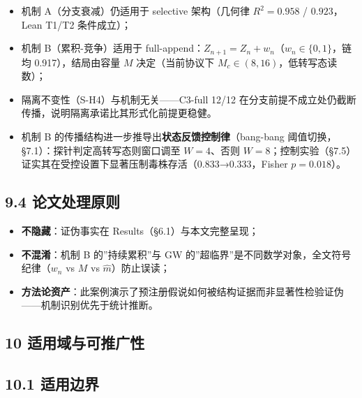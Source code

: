 \documentclass[
]{ctexart}
\providecommand{\tightlist}{%
  \setlength{\itemsep}{0pt}\setlength{\parskip}{0pt}}
\begin{document}
\begin{itemize}
\tightlist
\item
  机制 A（分支衰减）仍适用于 selective 架构（几何律 \(R^2=0.958\) /
  \(0.923\)，Lean T1/T2 条件成立）；
\item
  机制 B（累积-竞争）适用于
  full-append：\(Z_{n+1}=Z_n+w_n\)（\(w_n\in\{0,1\}\)，链均
  0.917），结局由容量 \(M\) 决定（当前协议下
  \(M_c\in(8,16)\)，低转写态读数）；
\item
  隔离不变性（S-H4）与机制无关------C3-full 12/12
  在分支前提不成立处仍截断传播，说明隔离承诺比其形式化前提更稳健。
\item
  机制 B 的传播结构进一步推导出\textbf{状态反馈控制律}（bang-bang
  阈值切换，§7.1）：探针判定高转写态则窗口调至 \(W{=}4\)、否则
  \(W{=}8\)；控制实验（§7.5）证实其在受控设置下显著压制毒株存活（0.833→0.333，Fisher
  \(p{=}0.018\)）。
\end{itemize}

\subsection{9.4
论文处理原则}\label{ux8bbaux6587ux5904ux7406ux539fux5219}

\begin{itemize}
\tightlist
\item
  \textbf{不隐藏}：证伪事实在 Results（§6.1）与本文完整呈现；
\item
  \textbf{不混淆}：机制 B 的''持续累积''与 GW
  的''超临界''是不同数学对象，全文符号纪律（\(w_n\) vs \(M\) vs
  \(\hat m\)）防止误读；
\item
  \textbf{方法论资产}：此案例演示了预注册假说如何被结构证据而非显著性检验证伪------机制识别优先于统计推断。
\end{itemize}

\subsection{10
适用域与可推广性}\label{ux9002ux7528ux57dfux4e0eux53efux63a8ux5e7fux6027}

\subsection{10.1 适用边界}\label{ux9002ux7528ux8fb9ux754c}
\end{document}
